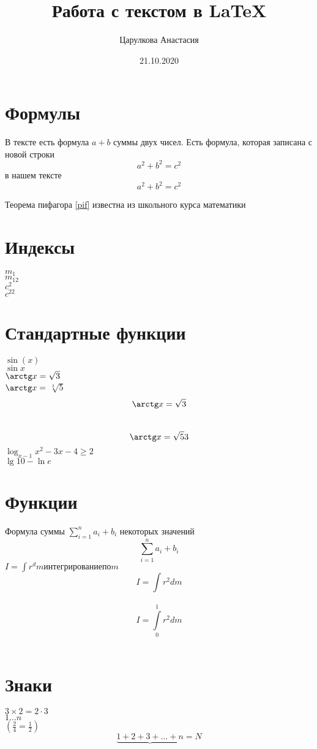 \documentclass[a4paper,12pt]{article} %
\author{Царулкова Анастасия}
\title{Работа с текстом в \LaTeX{}}
\date{21.10.2020}
\begin{document}

\maketitle
\newpage
\section{Формулы}
В тексте есть формула $a+b$ суммы двух чисел.
Есть формула, которая записана с новой строки $$a^2+b^2=c^2$$ в нашем тексте
\begin{equation} \label {pif}
a^2+b^2=c^2
\end{equation}

Теорема пифагора \eqref{pif} известна из школьного курса математики

\section{Индексы}
$m_1$ \\
$m_{12}$ \\
$c^2$ \\
$c^{22}$

\section{Стандартные функции}
$\sin(x)$ \\
$\sin x$ \\
$\arctg x= \sqrt{3} $\\
$\arctg x=$ $\sqrt[3]{5}$ \\


\begin{equation}
\arctg x=\sqrt{3}
\end{equation}
\\
\begin{equation}
\arctg x=\sqrt{5}{3}
\end{equation}
$\log_{x-1}{x^2-3x-4} \geqslant 2$ \\
$\lg 10 - \ln e$

\section{Функции}
Формула суммы $\sum_{i=1}^{n}a_i+b_i$ некоторых значений \\
\[ \sum_{i=1}^{n}a_i+b_i \]
$ I=\int r^dm интегрирование по m $ \\
\[I=\int r^2dm\]\\
\[I=\int\limits_{0}^{1} r^2dm\]\\

\section{Знаки}

$ 3\times2=2\cdot 3 $ \\
$1 \dots n $\\

$(\frac{2}{4}= \frac{1}{2})$
\[\underbrace{1+2+3+\dots+n} = N \]
\end{document}
